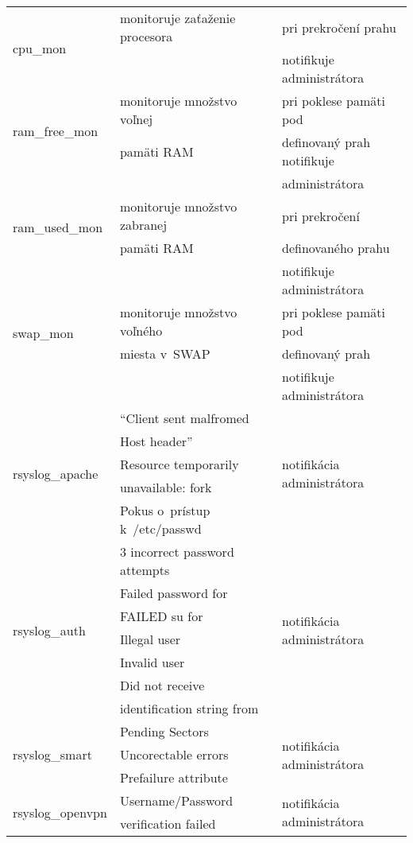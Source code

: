 \begin{tabular}{ | l | l | l | }
	\multirow{2}{*}{cpu\_mon} & monitoruje zaťaženie procesora & pri prekročení prahu\\
	&  & notifikuje administrátora\\ \hline
	
	\multirow{2}{*}{ram\_free\_mon} & monitoruje množstvo voľnej  & pri poklese pamäti pod\\
	& pamäti RAM &definovaný prah notifikuje \\
	& &administrátora\\ \hline

	\multirow{2}{*}{ram\_used\_mon} & monitoruje množstvo zabranej  & pri prekročení \\
	& pamäti RAM &definovaného prahu  \\
	& &notifikuje administrátora\\ \hline
	
	\multirow{2}{*}{swap\_mon} & monitoruje množstvo voľného  & pri poklese pamäti pod\\
	& miesta v~SWAP &  definovaný prah \\
	&&notifikuje administrátora\\ \hline
	
	\multirow{5}{*}{rsyslog\_apache} & “Client sent malfromed & \multirow{5}{*}{notifikácia administrátora}\\
	& Host header” & \\ \cline{2-2}
	& Resource temporarily &  \\ 
	& unavailable: fork & \\ \cline{2-2}
	& Pokus o~prístup k~/etc/passwd & \\ \hline
	
	\multirow{7}{*}{rsyslog\_auth} & 3 incorrect password attempts & \multirow{7}{*}{notifikácia administrátora}\\ \cline{2-2}
	& Failed password for & \\ \cline{2-2}
	& FAILED su for &  \\ \cline{2-2}
	& Illegal user & \\ \cline{2-2}
	& Invalid user & \\ \cline{2-2}
	& Did not receive & \\
	& identification string from & \\ \hline
	
	\multirow{3}{*}{rsyslog\_smart} & Pending Sectors &  \multirow{3}{*}{notifikácia administrátora} \\ \cline{2-2}
	& Uncorectable errors &  \\ \cline{2-2}
	& Prefailure attribute &  \\ \hline
	
	\multirow{2}{*}{rsyslog\_openvpn} & Username/Password  &  \multirow{2}{*}{notifikácia administrátora} \\
	& verification failed &  \\ \hline
	

\end{tabular}


